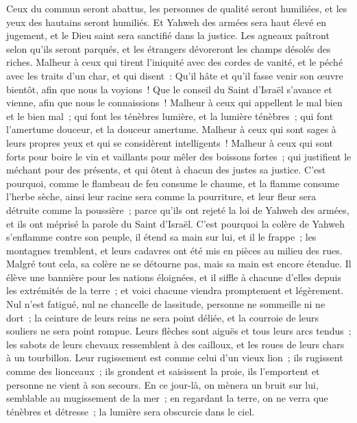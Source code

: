 \begin{multicols}{2}
Ceux du commun seront abattus, les personnes de qualité seront humiliées, et les yeux des hautains seront humiliés.
Et Yahweh des armées sera haut élevé en jugement, et le Dieu saint sera sanctifié dans la justice.
Les agneaux paîtront selon qu'ils seront parqués, et les étrangers dévoreront les champs désolés des riches.
Malheur à ceux qui tirent l'iniquité avec des cordes de vanité, et le péché avec les traits d'un char,
et qui disent~: Qu'il hâte et qu'il fasse venir son œuvre bientôt, afin que nous la voyions~! Que le conseil du Saint d'Israël s'avance et vienne, afin que nous le connaissions~!
Malheur à ceux qui appellent le mal bien et le bien mal~; qui font les ténèbres lumière, et la lumière ténèbres~; qui font l'amertume douceur, et la douceur amertume.
Malheur à ceux qui sont sages à leurs propres yeux et qui se considèrent intelligents~!
Malheur à ceux qui sont forts pour boire le vin et vaillants pour mêler des boissons fortes~;
qui justifient le méchant pour des présents, et qui ôtent à chacun des justes sa justice.
C'est pourquoi, comme le flambeau de feu consume le chaume, et la flamme consume l'herbe sèche, ainsi leur racine sera comme la pourriture, et leur fleur sera détruite comme la poussière~; parce qu'ils ont rejeté la loi de Yahweh des armées, et ils ont méprisé la parole du Saint d'Israël.
C'est pourquoi la colère de Yahweh s'enflamme contre son peuple, il étend sa main sur lui, et il le frappe~; les montagnes tremblent, et leurs cadavres ont été mis en pièces au milieu des rues. Malgré tout cela, sa colère ne se détourne pas, mais sa main est encore étendue.
Il élève une bannière pour les nations éloignées, et il siffle à chacune d'elles depuis les extrémités de la terre~; et voici chacune viendra promptement et légèrement.
Nul n'est fatigué, nul ne chancelle de lassitude, personne ne sommeille ni ne dort~; la ceinture de leurs reins ne sera point déliée, et la courroie de leurs souliers ne sera point rompue.
Leurs flèches sont aiguës et tous leurs arcs tendus~; les sabots de leurs chevaux ressemblent à des cailloux, et les roues de leurs chars à un tourbillon.
Leur rugissement est comme celui d'un vieux lion~; ils rugissent comme des lionceaux~; ils grondent et saisissent la proie, ils l'emportent et personne ne vient à son secours.
En ce jour-là, on mènera un bruit sur lui, semblable au mugissement de la mer~; en regardant la terre, on ne verra que ténèbres et détresse~; la lumière sera obscurcie dans le ciel.

\end{multicols}
